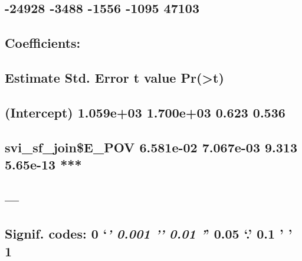 \documentclass[
  12pt,
]{article}
\begin{document}
\hypertarget{section-66}{%
\subsection{-24928 -3488 -1556 -1095 47103}\label{section-66}}

\hypertarget{section-67}{%
\subsection{}\label{section-67}}

\hypertarget{coefficients-6}{%
\subsection{Coefficients:}\label{coefficients-6}}

\hypertarget{estimate-std.-error-t-value-prt-6}{%
\subsection{Estimate Std. Error t value
Pr(\textgreater\textbar t\textbar)}\label{estimate-std.-error-t-value-prt-6}}

\hypertarget{intercept-1.059e03-1.700e03-0.623-0.536}{%
\subsection{(Intercept) 1.059e+03 1.700e+03 0.623
0.536}\label{intercept-1.059e03-1.700e03-0.623-0.536}}

\hypertarget{svi_sf_joine_pov-6.581e-02-7.067e-03-9.313-5.65e-13}{%
\subsection{svi\_sf\_join\$E\_POV 6.581e-02 7.067e-03 9.313 5.65e-13
***}\label{svi_sf_joine_pov-6.581e-02-7.067e-03-9.313-5.65e-13}}

\hypertarget{section-68}{%
\subsection{---}\label{section-68}}

\hypertarget{signif.-codes-0-0.001-0.01-0.05-.-0.1-1-6}{%
\subsection{\texorpdfstring{Signif. codes: 0 `\emph{\textbf{' 0.001 '}'
0.01 '}' 0.05 `.' 0.1 ' '
1}{Signif. codes: 0 `\,' 0.001 '\,' 0.01 '\,' 0.05 `.' 0.1 ' ' 1}}\label{signif.-codes-0-0.001-0.01-0.05-.-0.1-1-6}}
\end{document}

